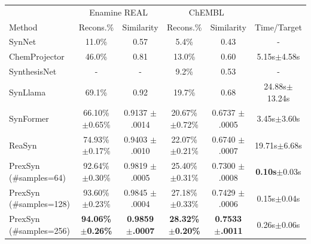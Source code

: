 \begin{tabular}{l cc cc c}
\toprule
 & \multicolumn{2}{c}{Enamine REAL} & \multicolumn{2}{c}{ChEMBL} \\
Method & Recons.\% & Similarity & Recons.\% & Similarity & Time/Target \\
\midrule
SynNet \citep{gao2021amortized} & 11.0\% & 0.57 & \phantom{0}5.4\% & 0.43 & - \\
ChemProjector \citep{luo2024projecting} & 46.0\% & 0.81 & 13.0\% & 0.60 & 5.15s$\pm$4.58s \\
SynthesisNet \citep{sun2024procedural} & - & - & \phantom{0}9.2\% & 0.53 & - \\
SynLlama \citep{sun2025synllama} & 69.1\% & 0.92 & 19.7\% & 0.68 & 24.88s$\pm$13.24s \\
\addlinespace[0.3em]
SynFormer \citep{gao2025generative} & \makecell{66.10\%\\$\pm$0.65\%} & \makecell{0.9137\\$\pm$.0014} & \makecell{20.67\%\\$\pm$0.72\%} & \makecell{0.6737\\$\pm$.0005} & 3.45s$\pm$3.60s \\
\addlinespace[0.3em]
ReaSyn \citep{lee2025rethinking} & \makecell{74.93\%\\$\pm$0.17\%} & \makecell{0.9403\\$\pm$.0010} & \makecell{22.07\%\\$\pm$0.21\%} & \makecell{0.6740\\$\pm$.0007} & 19.71s$\pm$6.68s \\
\midrule
PrexSyn (\#samples=64) & \makecell{92.64\%\\$\pm$0.30\%} & \makecell{0.9819\\$\pm$.0005} & \makecell{25.40\%\\$\pm$0.31\%} & \makecell{0.7300\\$\pm$.0008} & {\bf 0.10s}$\pm$0.03s \\
\addlinespace[0.3em]
PrexSyn (\#samples=128) & \makecell{93.60\%\\$\pm$0.23\%} & \makecell{0.9845\\$\pm$.0004} & \makecell{27.18\%\\$\pm$0.33\%} & \makecell{0.7429\\$\pm$.0006} & 0.15s$\pm$0.04s \\
\addlinespace[0.3em]
PrexSyn (\#samples=256) & \makecell{\bf 94.06\%\\$\pm$0.26\%} & \makecell{\bf 0.9859\\$\pm$.0007} & \makecell{\bf 28.32\%\\$\pm$0.20\%} & \makecell{\bf 0.7533\\$\pm$.0011} & 0.26s$\pm$0.06s \\
\bottomrule
\end{tabular}
